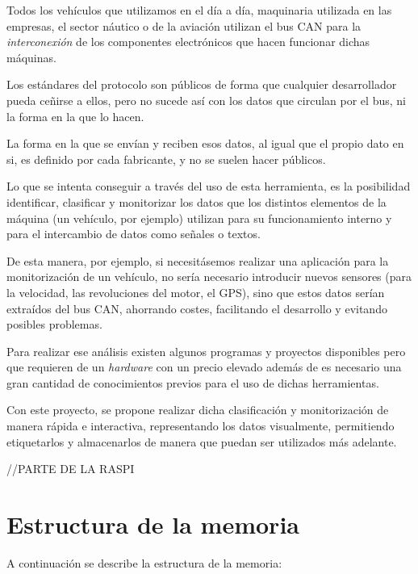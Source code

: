 
Todos los vehículos que utilizamos en el día a día, maquinaria utilizada en las empresas, el sector náutico o de la aviación utilizan el bus CAN para la \emph{interconexión} de los componentes electrónicos que hacen funcionar dichas máquinas.

Los estándares del protocolo son públicos de forma que cualquier desarrollador pueda ceñirse a ellos, pero no sucede así con los datos que circulan por el bus, ni la forma en la que lo hacen.

La forma en la que se envían y reciben esos datos, al igual que el propio dato en si, es definido por cada fabricante, y no se suelen hacer públicos.

Lo que se intenta conseguir a través del uso de esta herramienta, es la posibilidad identificar, clasificar y monitorizar los datos que los distintos elementos de la máquina (un vehículo, por ejemplo) utilizan para su funcionamiento interno y para el intercambio de datos como señales o textos.

De esta manera, por ejemplo, si necesitásemos realizar una aplicación para la monitorización de un vehículo, no sería necesario introducir nuevos sensores (para la velocidad, las revoluciones del motor, el GPS), sino que estos datos serían extraídos del bus CAN, ahorrando costes, facilitando el desarrollo y evitando posibles problemas.


Para realizar ese análisis existen algunos programas y proyectos disponibles pero que requieren de un \emph{hardware} con un precio elevado además de es necesario una gran cantidad de conocimientos previos para el uso de dichas herramientas.

Con este proyecto, se propone realizar dicha clasificación y monitorización de manera rápida e interactiva, representando los datos visualmente, permitiendo etiquetarlos y almacenarlos de manera que puedan ser utilizados más adelante.

//PARTE DE LA RASPI

\section{Estructura de la memoria}\label{estructura-de-la-memoria}

A continuación se describe la estructura de la memoria:

